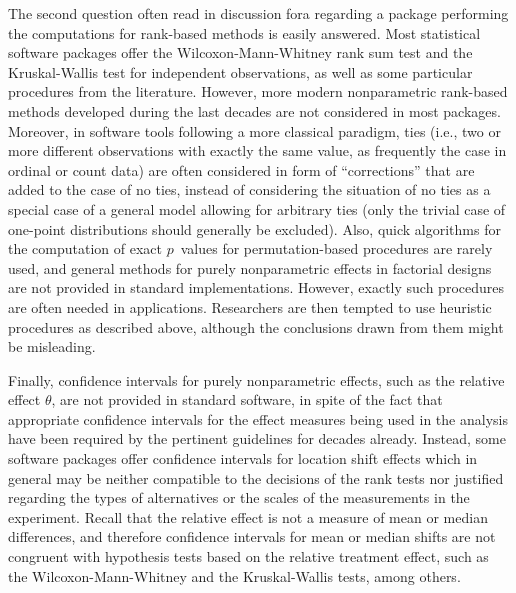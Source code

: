 The second question often read in discussion fora regarding a package 
performing the computations for rank-based methods is easily answered. Most 
statistical software packages offer the Wilcoxon-Mann-Whitney rank sum test and 
the Kruskal-Wallis test for independent observations, as well as some 
particular procedures from the literature. However, more modern nonparametric 
rank-based methods developed during the last decades 
\citep{ruymgaart1980unified,akritas1994fully, akritas1997nonparametric, 
brunner199619, konietschke2012rank, brunner2017rank, brunner2019rank} 
are not considered in most packages. Moreover, in software tools following a 
more classical paradigm, ties (i.e., two or more different observations with 
exactly the same value, as frequently the case in ordinal or count data) are 
often considered in form of ``corrections'' that are added to the case of no 
ties, instead of considering the situation of no ties as a special case of a 
general model allowing for arbitrary ties (only the trivial case of one-point
distributions should generally be excluded). Also, quick algorithms 
\citep{streitberg1986exact,mehta1988importance} for the computation of exact 
$p$~values for permutation-based procedures are rarely used, and general 
methods for purely nonparametric effects in factorial designs are not provided 
in standard implementations. However, exactly such procedures are often needed 
in applications. Researchers are then tempted to use heuristic procedures as 
described above, although the conclusions drawn from them might be misleading. 

Finally, confidence intervals for purely nonparametric effects, such as the 
relative effect $\theta$, are not provided in standard software, in spite of 
the fact that appropriate confidence intervals for the effect measures being 
used in the analysis have been required by the pertinent guidelines for decades 
already. Instead, some software packages offer confidence intervals for 
location shift effects which in general may be neither compatible to the 
decisions of the rank tests nor justified regarding the types of alternatives 
or the scales of the measurements in the experiment. Recall that the relative 
effect is not a measure of mean or median differences, and therefore confidence 
intervals for mean or median shifts are not congruent with hypothesis tests 
based on the relative treatment effect, such as the Wilcoxon-Mann-Whitney and 
the Kruskal-Wallis tests, among others.

